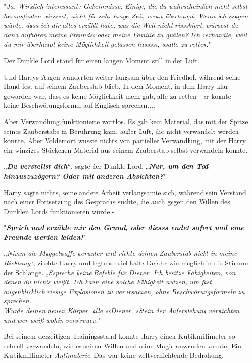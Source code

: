 {"\emph{Ja. Wirklich interessante Geheimnisse. Einige, die du wahrscheinlich nicht selbst herausfinden wirsssst, nicht für sehr lange Zeit, wenn überhaupt. Wenn ich ssagen würde, dass ich dir alles erzählt habe, was die Welt nicht rissskiert, würdest du dann aufhören meine Freundss oder meine Familie zu quälen? Ich verhandle, weil du mir überhaupt keine Möglichkeit gelassen hasssst, ssalle zu retten.}"

Der Dunkle Lord stand für einen langen Moment still in der Luft.

Und Harrys Augen wanderten weiter langsam über den Friedhof, während seine Hand fest auf seinem Zauberstab blieb. In dem Moment, in dem Harry klar geworden war, dass es keine Möglichkeit mehr gab, alle zu retten - er konnte keine Beschwörungsformel auf Englisch sprechen....

Aber Verwandlung funktionierte wortlos. Es gab kein Material, das mit der Spitze seines Zauberstabs in Berührung kam, außer Luft, die nicht verwandelt werden konnte. Aber Voldemort wusste nichts von partieller Verwandlung, mit der Harry ein winziges Stückchen Material aus seinem Zauberstab selbst verwandeln konnte.

„\textbf{\emph{Du verstellst dich}}“, sagte der Dunkle Lord. „\textbf{\emph{Nur, um den Tod hinauszuzögern? Oder mit anderen Absichten?}}"

Harry sagte nichts, seine andere Arbeit verlangsamte sich, während sein Verstand nach einer Fortsetzung des Gesprächs suchte, die auch gegen den Willen des Dunklen Lords funktionieren würde -

"\textbf{\emph{Sprich und erzähle mir den Grund, oder diesss endet sofort und eine Freunde werden leiden!}}"

„\emph{Nimm die Muggelwaffe herunter und richte deinen Zauberstab nicht in meine Richtung}“, zischte Harry und legte so viel kalte Gefahr wie möglich in die Stimme der Schlange. „\emph{Sspreche keine Befehle für Diener. Ich besitze Fähigkeiten, von denen du nichts weißt. Ich kann eine solche Fähigkeit nutzen, um fast augenblicklich riesige Explosionen zu verursachen, ohne Beschwörungsformeln zu sprechen.\\ Würde deinen neuen Körper, alle ssDiener, sStein der Auferstehung vernichten und wer weiß wohin verstreuen.}"

Bei seinem derzeitigen Trainingsstand konnte Harry einen Kubikmillimeter so schnell verwandeln, wie er seinen Willen und seine Magie anwenden konnte. Ein Kubikmillimeter \emph{Antimaterie}. Das war keine weltvernichtende Bedrohung.

}
